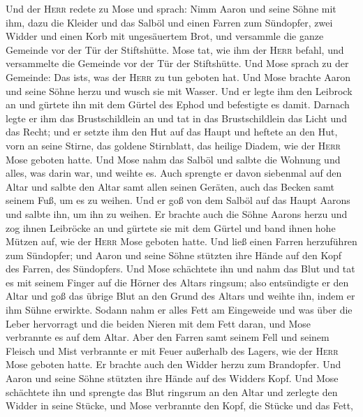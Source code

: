  Und der \textsc{Herr} redete zu Mose und sprach:
 Nimm Aaron und seine Söhne mit ihm, dazu die Kleider und
das Salböl und einen Farren zum Sündopfer, zwei Widder und einen Korb
mit ungesäuertem Brot,  und versammle die ganze Gemeinde
vor der Tür der Stiftshütte.  Mose tat, wie ihm der
\textsc{Herr} befahl, und versammelte die Gemeinde vor der Tür der
Stiftshütte.  Und Mose sprach zu der Gemeinde: Das
ist\textquotesingle s, was der \textsc{Herr} zu tun geboten hat.
 Und Mose brachte Aaron und seine Söhne herzu und wusch
sie mit Wasser.  Und er legte ihm den Leibrock an und
gürtete ihn mit dem Gürtel des Ephod und befestigte es damit.
 Darnach legte er ihm das Brustschildlein an und tat in
das Brustschildlein das Licht und das Recht;  und er
setzte ihm den Hut auf das Haupt und heftete an den Hut, vorn an seine
Stirne, das goldene Stirnblatt, das heilige Diadem, wie der
\textsc{Herr} Mose geboten hatte.  Und Mose nahm das
Salböl und salbte die Wohnung und alles, was darin war, und weihte es.
 Auch sprengte er davon siebenmal auf den Altar und
salbte den Altar samt allen seinen Geräten, auch das Becken samt seinem
Fuß, um es zu weihen.  Und er goß von dem Salböl auf das
Haupt Aarons und salbte ihn, um ihn zu weihen.  Er
brachte auch die Söhne Aarons herzu und zog ihnen Leibröcke an und
gürtete sie mit dem Gürtel und band ihnen hohe Mützen auf, wie der
\textsc{Herr} Mose geboten hatte.  Und ließ einen Farren
herzuführen zum Sündopfer; und Aaron und seine Söhne stützten ihre Hände
auf den Kopf des Farren, des Sündopfers.  Und Mose
schächtete ihn und nahm das Blut und tat es mit seinem Finger auf die
Hörner des Altars ringsum; also entsündigte er den Altar und goß das
übrige Blut an den Grund des Altars und weihte ihn, indem er ihm Sühne
erwirkte.  Sodann nahm er alles Fett am Eingeweide und
was über die Leber hervorragt und die beiden Nieren mit dem Fett daran,
und Mose verbrannte es auf dem Altar.  Aber den Farren
samt seinem Fell und seinem Fleisch und Mist verbrannte er mit Feuer
außerhalb des Lagers, wie der \textsc{Herr} Mose geboten hatte.
 Er brachte auch den Widder herzu zum Brandopfer. Und
Aaron und seine Söhne stützten ihre Hände auf des Widders Kopf.
 Und Mose schächtete ihn und sprengte das Blut ringsrum
an den Altar  und zerlegte den Widder in seine Stücke,
und Mose verbrannte den Kopf, die Stücke und das Fett, 
